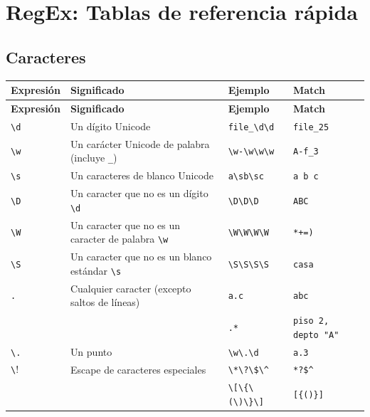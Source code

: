\documentclass[a4paper, 8pt]{extarticle}
\begin{document}
\section*{RegEx: Tablas de referencia rápida}

\subsection*{Caracteres}

\begin{longtable}{@{} p{2cm} p{7.5cm} p{3cm} p{5cm} @{}}
\toprule
\textbf{Expresión} & \textbf{Significado} & \textbf{Ejemplo} & \textbf{Match} \\
\midrule
\endfirsthead
\toprule
\textbf{Expresión} & \textbf{Significado} & \textbf{Ejemplo} & \textbf{Match} \\
\midrule
\endhead
\bottomrule
\endfoot
\bottomrule
\endlastfoot

\centering \verb!\d! & Un dígito Unicode                                      & \verb!file_\d\d!    & \verb!file_25!           \\
\centering \verb!\w! & Un carácter Unicode de palabra (incluye \verb!_!)      & \verb!\w-\w\w\w!    & \verb!A-f_3!             \\
\centering \verb!\s! & Un caracteres de blanco Unicode                        & \verb!a\sb\sc!      & \verb!a b c!             \\
\centering \verb!\D! & Un caracter que no es un dígito \verb!\d!              & \verb!\D\D\D!       & \verb!ABC!               \\
\centering \verb!\W! & Un caracter que no es un caracter de palabra \verb!\w! & \verb!\W\W\W\W!     & \verb!*+=)!              \\
\centering \verb!\S! & Un caracter que no es un blanco estándar \verb!\s!     & \verb!\S\S\S\S!     & \verb!casa!              \\
\centering \verb!.!  & Cualquier caracter (excepto saltos de líneas)          & \verb!a.c!          & \verb!abc!               \\
                     &                                                        & \verb!.*!           & \verb!piso 2, depto "A"! \\
\centering \verb!\.! & Un punto                                               & \verb!\w\.\d!       & \verb!a.3!               \\
\centering \verb!\!  & Escape de caracteres especiales                        & \verb!\*\?\$\^!     & \verb!*?$^!              \\
                     &                                                        & \verb!\[\{\(\)\}\]! & \verb![{()}]!            \\
\end{longtable}
\end{document}
